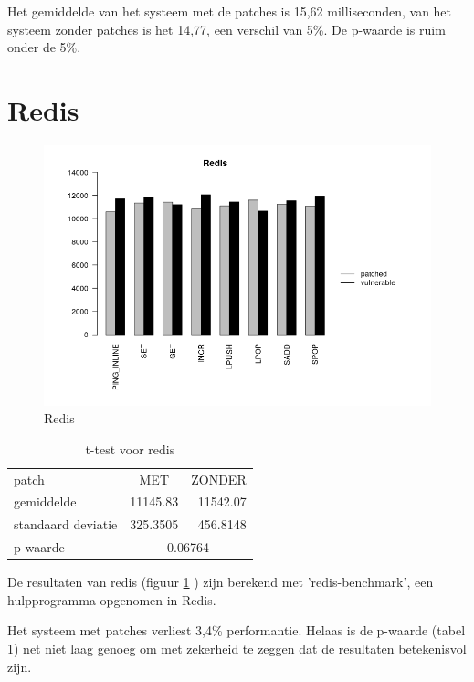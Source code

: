 Het gemiddelde van het systeem met de patches is 15,62 milliseconden, van het systeem zonder patches is het 14,77, een verschil van 5\%.
De p-waarde is ruim onder de 5\%.


\section{Redis}

\begin{figure}
	\includegraphics[width=1.0\linewidth]{img/redis.png}
	\caption{Redis}
	\label{fig:redis}
\end{figure}

\begin{table}[]
	\centering
	\caption{t-test voor redis}
	\label{t_redis}
	\begin{tabular}{l|cr}
		\hline
		patch              & MET                          & \multicolumn{1}{c}{ZONDER} \\
		gemiddelde         & \multicolumn{1}{r}{11145.83} & 11542.07                   \\
		standaard deviatie & \multicolumn{1}{r}{325.3505} & 456.8148                   \\ \hline
		p-waarde           & \multicolumn{2}{c|}{0.06764}                             
	\end{tabular}
\end{table}


De resultaten van redis (figuur \ref{fig:redis} ) zijn berekend met 'redis-benchmark', een hulpprogramma opgenomen in Redis.

Het systeem met patches verliest 3,4\% performantie.
Helaas is de p-waarde (tabel \ref{t_redis}) net niet laag genoeg om met zekerheid te zeggen dat de resultaten betekenisvol zijn.




